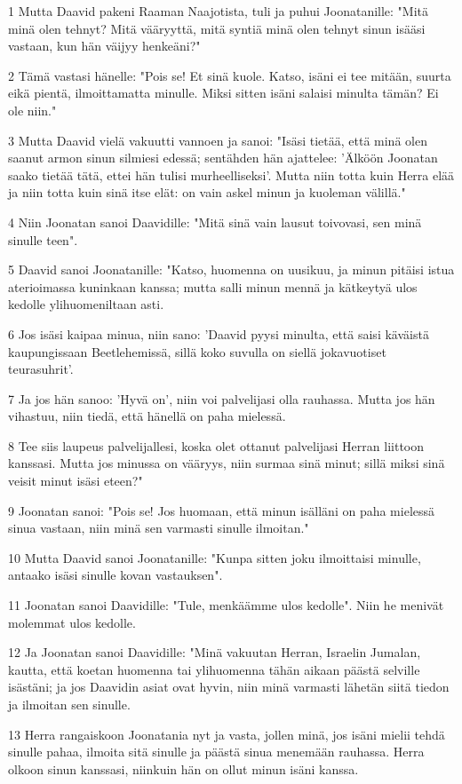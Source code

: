 \par 1 Mutta Daavid pakeni Raaman Naajotista, tuli ja puhui Joonatanille: "Mitä minä olen tehnyt? Mitä vääryyttä, mitä syntiä minä olen tehnyt sinun isääsi vastaan, kun hän väijyy henkeäni?"
\par 2 Tämä vastasi hänelle: "Pois se! Et sinä kuole. Katso, isäni ei tee mitään, suurta eikä pientä, ilmoittamatta minulle. Miksi sitten isäni salaisi minulta tämän? Ei ole niin."
\par 3 Mutta Daavid vielä vakuutti vannoen ja sanoi: "Isäsi tietää, että minä olen saanut armon sinun silmiesi edessä; sentähden hän ajattelee: 'Älköön Joonatan saako tietää tätä, ettei hän tulisi murheelliseksi'. Mutta niin totta kuin Herra elää ja niin totta kuin sinä itse elät: on vain askel minun ja kuoleman välillä."
\par 4 Niin Joonatan sanoi Daavidille: "Mitä sinä vain lausut toivovasi, sen minä sinulle teen".
\par 5 Daavid sanoi Joonatanille: "Katso, huomenna on uusikuu, ja minun pitäisi istua aterioimassa kuninkaan kanssa; mutta salli minun mennä ja kätkeytyä ulos kedolle ylihuomeniltaan asti.
\par 6 Jos isäsi kaipaa minua, niin sano: 'Daavid pyysi minulta, että saisi käväistä kaupungissaan Beetlehemissä, sillä koko suvulla on siellä jokavuotiset teurasuhrit'.
\par 7 Ja jos hän sanoo: 'Hyvä on', niin voi palvelijasi olla rauhassa. Mutta jos hän vihastuu, niin tiedä, että hänellä on paha mielessä.
\par 8 Tee siis laupeus palvelijallesi, koska olet ottanut palvelijasi Herran liittoon kanssasi. Mutta jos minussa on vääryys, niin surmaa sinä minut; sillä miksi sinä veisit minut isäsi eteen?"
\par 9 Joonatan sanoi: "Pois se! Jos huomaan, että minun isälläni on paha mielessä sinua vastaan, niin minä sen varmasti sinulle ilmoitan."
\par 10 Mutta Daavid sanoi Joonatanille: "Kunpa sitten joku ilmoittaisi minulle, antaako isäsi sinulle kovan vastauksen".
\par 11 Joonatan sanoi Daavidille: "Tule, menkäämme ulos kedolle". Niin he menivät molemmat ulos kedolle.
\par 12 Ja Joonatan sanoi Daavidille: "Minä vakuutan Herran, Israelin Jumalan, kautta, että koetan huomenna tai ylihuomenna tähän aikaan päästä selville isästäni; ja jos Daavidin asiat ovat hyvin, niin minä varmasti lähetän siitä tiedon ja ilmoitan sen sinulle.
\par 13 Herra rangaiskoon Joonatania nyt ja vasta, jollen minä, jos isäni mielii tehdä sinulle pahaa, ilmoita sitä sinulle ja päästä sinua menemään rauhassa. Herra olkoon sinun kanssasi, niinkuin hän on ollut minun isäni kanssa.
